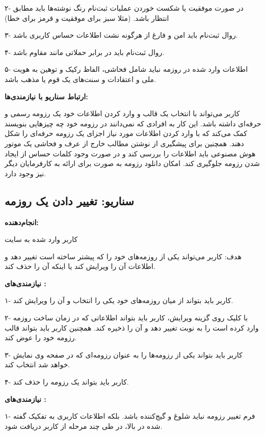 \documentclass[]{article}
\begin{document}
	۲- در صورت موفقیت یا شکست خوردن عملیات ثبت‌نام رنگ نوشته‌ها باید مطابق انتظار باشد. (مثلا سبز برای موفقیت و قرمز برای خطا)
	
	۳- روال ثبت‌نام باید امن و فارغ از هرگونه نشت اطلاعات حساس کاربری باشد.
	
	۴- روال ثبت‌نام باید در برابر حملاتی مانند  مقاوم باشد.
	
	۵- اطلاعات وارد شده در روزمه نباید شامل فحاشی، الفاظ رکیک و توهین به هویت ملی و اعتقادات و سنت‌های یک قوم یا مذهب باشد.
	
	\textbf{ارتباط سناریو با نیازمندی‌ها:}
	
	کاربر می‌تواند با انتخاب یک قالب و وارد کردن اطلاعات خود یک رزومه رسمی و حرفه‌ای داشته باشد. این کار به افرادی که نمی‌دانند در رزومه خود چه چیزهایی بنویسند کمک می‌کند که با وارد کردن اطلاعات مورد نیاز اجزای یک رزومه حرفه‌ای را شکل دهند. همچنین برای پیشگیری از نوشتن مطالب خارج از عرف و فحاشی یک موتور هوش مصنوعی باید اطلاعات را بررسی کند و در صورت وجود کلمات حساس از ایجاد شدن رزومه جلوگیری کند. امکان دانلود رزومه به صورت  برای ارائه به کارفرمایان دیگر نیز وجود دارد.
	
	
	\subsection{\LARGE{سناریو: تغییر دادن یک روزمه}}
	
	\textbf{انجام‌دهنده:}
	
	کاربر وارد شده به سایت
	
	هدف: کاربر می‌تواند یکی از روزمه‌های خود را که پیشتر ساخته است تغییر دهد و اطلاعات آن را ویرایش کند یا اینکه آن را حذف کند.
	
	\textbf{نیازمندی‌های :} 
	
	۱- کاربر باید بتواند از میان روزمه‌های خود یکی را انتخاب و آن را ویرایش کند.
	
	۲- با کلیک روی گزینه ویرایش، کاربر باید بتواند اطلاعاتی که در زمان ساخت روزمه وارد کرده است را به نوبت تغییر دهد و آن را ذخیره کند. همچنین کاربر باید بتواند قالب رزومه خود را عوض کند.
	
	۳- کاربر باید بتواند یکی از رزومه‌ها را به عنوان رزومه‌ای که در صفحه وی نمایش خواهد شد انتخاب کند.
	
	۴- کاربر باید بتواند یک رزومه را حذف کند.
	
	\textbf{نیازمندی‌های :}
	
	۱- فرم تغییر رزومه نباید شلوغ و گیج‌کننده باشد. بلکه اطلاعات کاربری به تفکیک گفته شده در بالا، در طی چند مرحله از کاربر دریافت شود.
	
\end{document}

